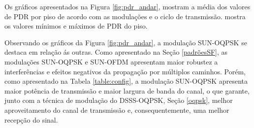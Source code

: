 
Os gráficos apresentados na Figura \ref{fig:pdr_andar}, mostram a média dos valores de PDR por piso de acordo com as modulações e o ciclo de transmissão.  mostra os valores mínimos e máximos de PDR do piso.

Observando os gráficos da Figura \ref{fig:pdr_andar}, a modulação SUN-OQPSK se destaca em relação ás outras. Como apresentado na Seção \ref{padrõesSF}, as modulações SUN-OQPSK e SUN-OFDM apresentam maior robustez a interferências e efeitos negativos da propagação por múltiplos caminhos. Porém, como apresentado na Tabela \ref{table:config}, a modulação SUN-OQPSK apresenta maior potência de transmissão e maior largura de banda do canal, o que garante, junto com a técnica de modulação do DSSS-OQPSK, Seção \ref{oqpsk}, melhor aproveitamento do canal de transmissão e, consequentemente, uma melhor recepção do sinal.

